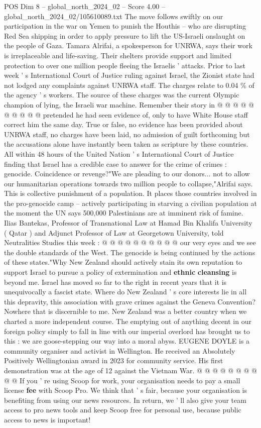 \begin{textsample}{POS Dim 8 – global\_north\_2024\_02 – Score 4.00 – global\_north\_2024\_02/105610089.txt}
The move follows swiftly on our participation in the war on Yemen to punish the Houthis -- who are disrupting Red Sea shipping in order to apply pressure to lift the US-Israeli onslaught on the people of Gaza.
Tamara Alrifai, a spokesperson for UNRWA, says their work is irreplaceable and life-saving.
Their shelters provide support and limited protection to over one million people fleeing the Israelis ' attacks.
Prior to last week ' s International Court of Justice ruling against Israel, the Zionist state had not lodged any complaints against UNRWA staff.
The charges relate to 0.04 \% of the agency ' s workers.
The source of these charges was the current Olympic champion of lying, the Israeli war machine.
Remember their story in @ @ @ @ @ @ @ @ @ @ pretended he had seen evidence of, only to have White House staff correct him the same day.
True or false, no evidence has been provided about UNRWA staff, no charges have been laid, no admission of guilt forthcoming but the accusations alone have instantly been taken as scripture by these countries.
All within 48 hours of the United Nation ' s International Court of Justice finding that Israel has a credible case to answer for the crime of crimes : genocide.
Coincidence or revenge?"We are pleading to our donors... not to allow our humanitarian operations towards two million people to collapse,"Alrifai says.
This is collective punishment of a population.
It places those countries involved in the pro-genocide camp -- actively participating in starving a civilian population at the moment the UN says 500,000 Palestinians are at imminent risk of famine.
Ilias Bantekas, Professor of Transnational Law at Hamad Bin Khalifa University ( Qatar ) and Adjunct Professor of Law at Georgetown University, told Neutralities Studies this week : @ @ @ @ @ @ @ @ @ @ our very eyes and we see the double standards of the West.
The genocide is being continued by the actions of these states."Why New Zealand should actively stain its own reputation to support Israel to pursue a policy of extermination and \textbf{ethnic} \textbf{cleansing} is beyond me.
Israel has moved so far to the right in recent years that it is unequivocally a fascist state.
Where do New Zealand ' s core interests lie in all this depravity, this association with grave crimes against the Geneva Convention?
Nowhere that is discernible to me.
New Zealand was a better country when we charted a more independent course.
The emptying out of anything decent in our foreign policy simply to fall in line with our imperial overlord has brought us to this : we are goose-stepping our way into a moral abyss.
EUGENE DOYLE is a community organiser and activist in Wellington.
He received an Absolutely Positively Wellingtonian award in 2023 for community service.
His first demonstration was at the age of 12 against the Vietnam War. @ @ @ @ @ @ @ @ @ @ If you ' re using Scoop for work, your organisation needs to pay a small license \textbf{fee} with Scoop Pro.
We think that ' s fair, because your organisation is benefiting from using our news resources.
In return, we ' ll also give your team access to pro news tools and keep Scoop free for personal use, because public access to news is important!


\end{textsample}
